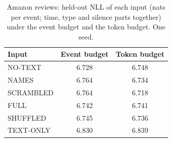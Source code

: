 \begin{table}[t]
\caption{Amazon reviews: held-out NLL of each input (nats per event; time, type and silence parts together) under the event budget and the token budget. One seed.}
\label{tab:rq3inputs}
\footnotesize\setlength{\tabcolsep}{4pt}
\begin{tabular}{@{}lcc@{}}
\toprule
Input & Event budget & Token budget\\
\midrule
NO-TEXT & 6.728 & 6.748\\
NAMES & 6.764 & 6.734\\
SCRAMBLED & 6.764 & 6.718\\
FULL & 6.742 & 6.741\\
SHUFFLED & 6.745 & 6.736\\
TEXT-ONLY & 6.830 & 6.839\\
\bottomrule
\end{tabular}
\end{table}
